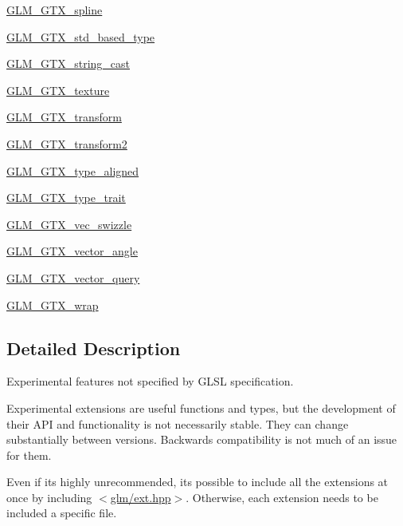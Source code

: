\begin{DoxyCompactItemize}
\item 
\hyperlink{group__gtx__spline}{G\+L\+M\+\_\+\+G\+T\+X\+\_\+spline}
\item 
\hyperlink{group__gtx__std__based__type}{G\+L\+M\+\_\+\+G\+T\+X\+\_\+std\+\_\+based\+\_\+type}
\item 
\hyperlink{group__gtx__string__cast}{G\+L\+M\+\_\+\+G\+T\+X\+\_\+string\+\_\+cast}
\item 
\hyperlink{group__gtx__texture}{G\+L\+M\+\_\+\+G\+T\+X\+\_\+texture}
\item 
\hyperlink{group__gtx__transform}{G\+L\+M\+\_\+\+G\+T\+X\+\_\+transform}
\item 
\hyperlink{group__gtx__transform2}{G\+L\+M\+\_\+\+G\+T\+X\+\_\+transform2}
\item 
\hyperlink{group__gtx__type__aligned}{G\+L\+M\+\_\+\+G\+T\+X\+\_\+type\+\_\+aligned}
\item 
\hyperlink{group__gtx__type__trait}{G\+L\+M\+\_\+\+G\+T\+X\+\_\+type\+\_\+trait}
\item 
\hyperlink{group__gtx__vec__swizzle}{G\+L\+M\+\_\+\+G\+T\+X\+\_\+vec\+\_\+swizzle}
\item 
\hyperlink{group__gtx__vector__angle}{G\+L\+M\+\_\+\+G\+T\+X\+\_\+vector\+\_\+angle}
\item 
\hyperlink{group__gtx__vector__query}{G\+L\+M\+\_\+\+G\+T\+X\+\_\+vector\+\_\+query}
\item 
\hyperlink{group__gtx__wrap}{G\+L\+M\+\_\+\+G\+T\+X\+\_\+wrap}
\end{DoxyCompactItemize}


\subsection{Detailed Description}
Experimental features not specified by G\+L\+SL specification. 

Experimental extensions are useful functions and types, but the development of their A\+PI and functionality is not necessarily stable. They can change substantially between versions. Backwards compatibility is not much of an issue for them.

Even if it\textquotesingle{}s highly unrecommended, it\textquotesingle{}s possible to include all the extensions at once by including $<$\hyperlink{ext_8hpp}{glm/ext.\+hpp}$>$. Otherwise, each extension needs to be included a specific file. 